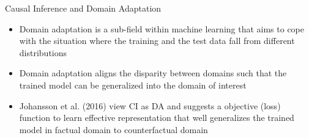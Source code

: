 \documentclass{beamer}
\begin{document}
	\begin{frame}{Causal Inference and Domain Adaptation}
		\begin{itemize}
			\item Domain adaptation is a sub-field within machine learning that aims to cope with the situation where the training and the test data fall from different distributions
			\item Domain adaptation aligns the disparity between domains such that the trained model can be generalized into the domain of interest
			\item Johansson et al. (2016) view CI as DA and suggests a objective (loss) function to learn effective representation that well generalizes the trained model in factual domain to counterfactual domain
		\end{itemize}

	\end{frame}
\end{document}
